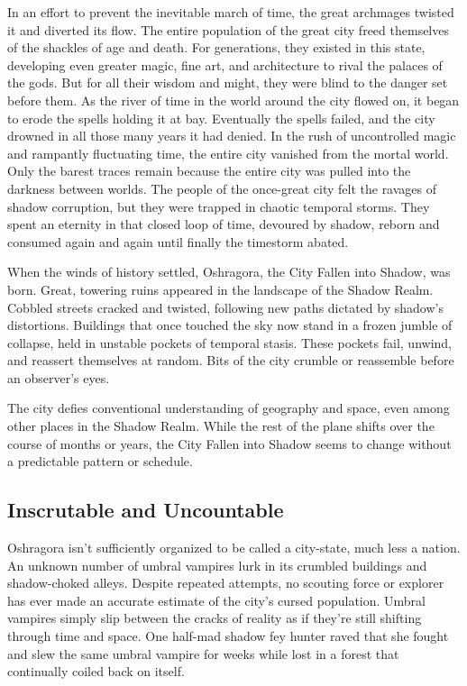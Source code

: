 \documentclass[10pt,a4paper,twoside,bg=print,twocolumn,openany,nodeprecatedcode]{dndbook}
\begin{document}
In an effort to prevent the inevitable march of time, the great archmages twisted it and diverted its flow. The entire population of the great city freed themselves of the shackles of age and death. For generations, they existed in this state, developing even greater magic, fine art, and architecture to rival the palaces of the gods. But for all their wisdom and might, they were blind to the danger set before them. As the river of time in the world around the city flowed on, it began to erode the spells holding it at bay. Eventually the spells failed, and the city drowned in all those many years it had denied. In the rush of uncontrolled magic and rampantly fluctuating time, the entire city vanished from the mortal world. Only the barest traces remain because the entire city was pulled into the darkness between worlds. The people of the once-great city felt the ravages of shadow corruption, but they were trapped in chaotic temporal storms. They spent an eternity in that closed loop of time, devoured by shadow, reborn and consumed again and again until finally the timestorm abated.

When the winds of history settled, Oshragora, the City Fallen into Shadow, was born. Great, towering ruins appeared in the landscape of the Shadow Realm. Cobbled streets cracked and twisted, following new paths dictated by shadow's distortions. Buildings that once touched the sky now stand in a frozen jumble of collapse, held in unstable pockets of temporal stasis. These pockets fail, unwind, and reassert themselves at random. Bits of the city crumble or reassemble before an observer's eyes.

The city defies conventional understanding of geography and space, even among other places in the Shadow Realm. While the rest of the plane shifts over the course of months or years, the City Fallen into Shadow seems to change without a predictable pattern or schedule.

\subsection{Inscrutable and Uncountable}
Oshragora isn't sufficiently organized to be called a city-state, much less a nation. An unknown number of umbral vampires lurk in its crumbled buildings and shadow-choked alleys. Despite repeated attempts, no scouting force or explorer has ever made an accurate estimate of the city's cursed population. Umbral vampires simply slip between the cracks of reality as if they're still shifting through time and space. One half-mad shadow fey hunter raved that she fought and slew the same umbral vampire for weeks while lost in a forest that continually coiled back on itself.
\end{document}
